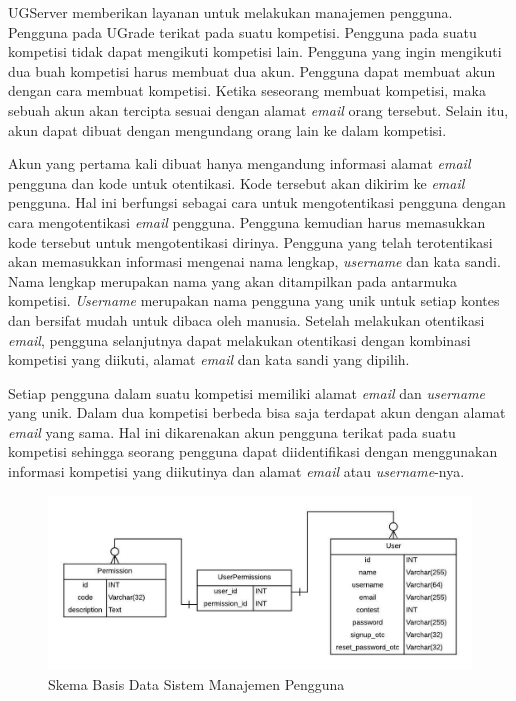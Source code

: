 \par UGServer memberikan layanan untuk melakukan manajemen pengguna. Pengguna pada UGrade terikat pada suatu kompetisi. Pengguna pada suatu kompetisi tidak dapat mengikuti kompetisi lain. Pengguna yang ingin mengikuti dua buah kompetisi harus membuat dua akun. Pengguna dapat membuat akun dengan cara membuat kompetisi. Ketika seseorang membuat kompetisi, maka sebuah akun akan tercipta sesuai dengan alamat \textit{email} orang tersebut. Selain itu, akun dapat dibuat dengan mengundang orang lain ke dalam kompetisi.

\par Akun yang pertama kali dibuat hanya mengandung informasi alamat \textit{email} pengguna dan kode untuk otentikasi. Kode tersebut akan dikirim ke \textit{email} pengguna. Hal ini berfungsi sebagai cara untuk mengotentikasi pengguna dengan cara mengotentikasi \textit{email} pengguna. Pengguna kemudian harus memasukkan kode tersebut untuk mengotentikasi dirinya. Pengguna yang telah terotentikasi akan memasukkan informasi mengenai nama lengkap, \textit{username} dan kata sandi. Nama lengkap merupakan nama yang akan ditampilkan pada antarmuka kompetisi. \textit{Username} merupakan nama pengguna yang unik untuk setiap kontes dan bersifat mudah untuk dibaca oleh manusia. Setelah melakukan otentikasi \textit{email}, pengguna selanjutnya dapat melakukan otentikasi dengan kombinasi kompetisi yang diikuti, alamat \textit{email} dan kata sandi yang dipilih. 

\par Setiap pengguna dalam suatu kompetisi memiliki alamat \textit{email} dan \textit{username} yang unik. Dalam dua kompetisi berbeda bisa saja terdapat akun dengan alamat \textit{email} yang sama. Hal ini dikarenakan akun pengguna terikat pada suatu kompetisi sehingga seorang pengguna dapat diidentifikasi dengan menggunakan informasi kompetisi yang diikutinya dan alamat \textit{email} atau \textit{username}-nya.

\begin{figure}[ht!]
    \centering
    \includegraphics[width=\textwidth]{images/user-schema}
    \caption{Skema Basis Data Sistem Manajemen Pengguna}
    \label{fig:user-schema}
\end{figure}


